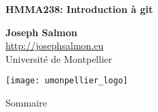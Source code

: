 \documentclass[unknownkeysallowed]{beamer}
\begin{document}


\begin{frame}
\bigskip
\bigskip
\begin{center}{
\LARGE\color{marron}
\textbf{HMMA238: Introduction à git}
\textbf{ }\\
\vspace{0.5cm}
}

\color{marron}
\textbf{}
\end{center}

\begin{center}
\textbf{Joseph Salmon} \\
\vspace{0.1cm}
\url{http://josephsalmon.eu}\\
\vspace{0.5cm}
Université de Montpellier \\
\end{center}

\centering
\texttt{[image: umonpellier\_logo]}

\end{frame}







\begin{frame}{Sommaire}
\tableofcontents[hideallsubsections]
\end{frame}



\end{document}
